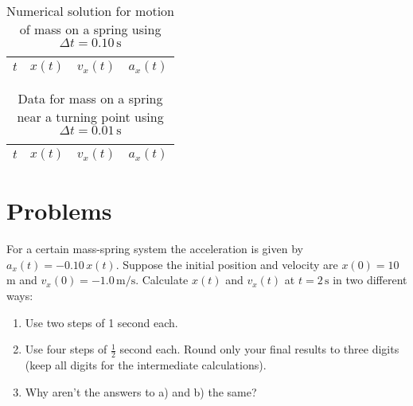 
\addtolength{\textheight}{.5in}
\addtolength{\footskip}{-2.in}
\mbox{}
\vspace{-2.in}

\twocolumn

\begin{table}[!t]
\caption{Numerical solution for motion of 
mass on a spring using $\Delta t=0.10\, \mbox{s}$}
\begin{small}
\begin{center}
\begin{tabular}{cccc}
$t$ & $x(t)$ & $v_x(t)$ & $a_x(t)$ \\
\hline

\hline
\end{tabular}
\end{center}
\end{small}
\label{table:numerical1}
\end{table}
\newpage

\begin{table}[!t]
\caption{Data for mass on a spring near a turning point using  
$\Delta t=0.01\, \mbox{s}$}
\begin{small}
\begin{center}
\begin{tabular}{cccc}
$t$ & $x(t)$ & $v_x(t)$ & $a_x(t)$ \\
\hline

\hline
\end{tabular}
\end{center}
\end{small}
\label{table:numerical2}
\end{table}

\onecolumn 
\addtolength{\textheight}{-.5in} 
\addtolength{\footskip}{2.in}





\section*{Problems}

\begin{problem}
  For a certain mass-spring system the acceleration is given by $a_x(t) =
  -0.10\, x(t)$.  Suppose the initial position and velocity are $x(0)
  = 10$ m and $v_x(0) = -1.0\, \mbox{m/s}$.  Calculate $x(t)$ and $v_x(t)$
  at $t = 2\, \mbox{s}$ in two different ways:
  \begin{enumerate}
  \item Use two steps of 1 second each.
  \item Use four steps of $\frac{1}{2}$ second each.  Round only your
    final results to three digits (keep all digits for the
    intermediate calculations).
  \item Why aren't the answers to a) and b) the same?
  \end{enumerate}
  \label{problem:ho-undamped-num}
\end{problem}


